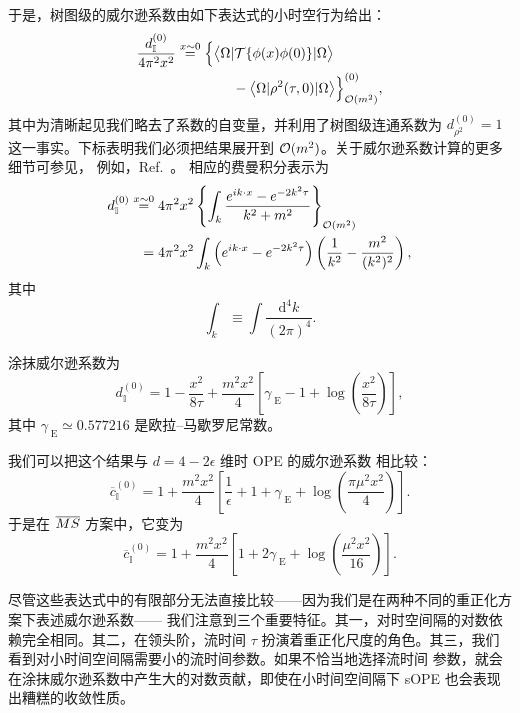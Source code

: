 于是，树图级的威尔逊系数由如下表达式的小时空行为给出：
\begin{align}
\frac{d_{\mathbb{I}}^{(0)}}{4\pi^2x^2}  \stackrel{x\sim 0}{=}{} &
\Big\{\big\langle
\Omega |
{\cal T}\{
\phi(x){} \phi(0)\} | \Omega \big\rangle \nonumber\\
{} & \qquad - \big\langle \Omega |
\rho^2(\tau,0)  | \Omega
\big\rangle\Big\}_{{\cal O}(m^2)}^{(0)} ,
\end{align}
其中为清晰起见我们略去了系数的自变量，并利用了树图级连通系数为 $d_{\rho^2}^{(0)}=1$
这一事实。下标表明我们必须把结果展开到 ${\cal O}(m^2)$。关于威尔逊系数计算的更多细节可参见，
例如，Ref.~\cite{Collins:1984rdg}。
相应的费曼积分表示为
\begin{align}
d_{\mathbb{I}}^{(0)} \stackrel{x\sim 0}{=} {} & 4\pi^2 x^2\left\{\int_k
\frac{e^{ik
\cdot
x}-e^{-2k^2 \tau
}}{k^2+m^2}\right\}_{{\cal O}(m^2)}
\nonumber \\
= {} & 4\pi^2x^2\int_k \left(e^{ik \cdot x} - e^{-2k^2
\tau}\right)\left(\frac{1}{k^2} - \frac{m^2}{(k^2)^2}\right),
\end{align}
其中
\begin{equation}
\int_k \equiv \int\frac{\mathrm{d}^4k}{(2\pi)^4}.
\end{equation}

涂抹威尔逊系数为
\begin{equation}\label{eq:d1lead}
d_{\mathbb{I}}^{(0)} = 1 -
\frac{x^2}{8\tau}  +\frac{m^2x^2}{4}\left[\gamma_{\;\mathrm{E}} -1 +
\log\left(\frac{x^2}{8\tau}\right)\right],
\end{equation}
其中 $\gamma_{\;\mathrm{E}}\simeq 0.577216$ 是欧拉--马歇罗尼常数。

我们可以把这个结果与 $d = 4-2\epsilon$
维时 OPE 的威尔逊系数 \cite{Collins:1984rdg} 相比较：
\begin{equation}
\overline{c}_{\mathbb{I}}^{(0)} =
1 + \frac{
m^2x^2}{4} \left[\frac{1}{\epsilon} + 1 +\gamma_{\;\mathrm{E}} +
\log\left(\frac{\pi\mu^2x^2}{4}\right)\right].
\end{equation}
于是在 $\overline{MS}$ 方案中，它变为
\begin{equation}
\overline{c}_{\mathbb{I}}^{(0)} =
1 +\frac{
m^2x^2}{4} \left[1 +  2\gamma_{\;\mathrm{E}} +
\log\left(\frac{\mu^2x^2}{16}\right)\right].
\end{equation}

尽管这些表达式中的有限部分无法直接比较——因为我们是在两种不同的重正化方案下表述威尔逊系数——
我们注意到三个重要特征。其一，对时空间隔的对数依赖完全相同。其二，在领头阶，流时间 $\tau$
扮演着重正化尺度的角色。其三，我们看到对小时间空间隔需要小的流时间参数。如果不恰当地选择流时间
参数，就会在涂抹威尔逊系数中产生大的对数贡献，即使在小时间空间隔下 sOPE 也会表现出糟糕的收敛性质。

